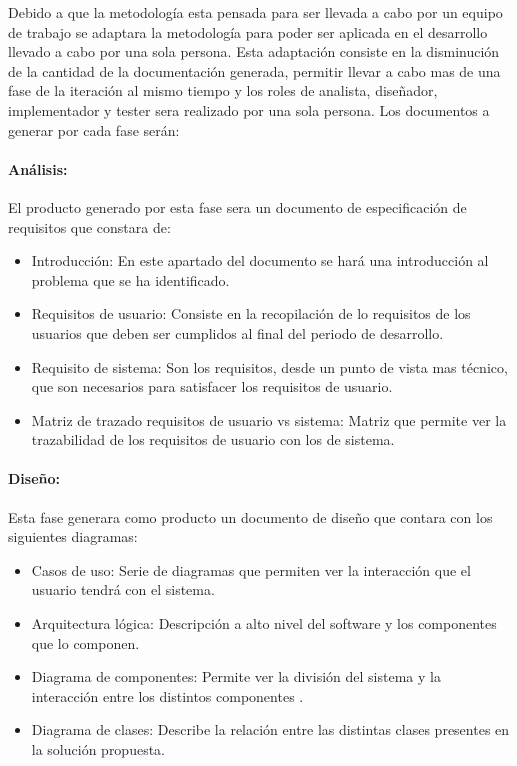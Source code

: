 \documentclass[11pt,letterpaper]{article}
\begin{document}
Debido a que la metodología esta pensada para ser llevada a cabo por un equipo de trabajo se adaptara la metodología para poder ser aplicada en el desarrollo llevado a cabo por una sola persona. Esta adaptación consiste en la disminución de la cantidad de la documentación generada, permitir llevar a cabo mas de una fase de la iteración al mismo tiempo y los roles de analista, diseñador, implementador y tester sera realizado por una sola persona. Los documentos a generar por cada fase serán:

\paragraph{Análisis:} El producto generado por esta fase sera un documento de especificación de requisitos que constara de:
\begin{itemize}
	\item Introducción: En este apartado del documento se hará una introducción al problema que se ha identificado.
	\item Requisitos de usuario: Consiste en la recopilación de lo requisitos de los usuarios que deben ser cumplidos al final del periodo de desarrollo.
	\item Requisito de sistema: Son los requisitos, desde un punto de vista mas técnico, que son necesarios para satisfacer los requisitos de usuario.
	\item Matriz de trazado requisitos de usuario vs sistema:  Matriz que permite ver la trazabilidad de los requisitos de usuario con los de sistema.
\end{itemize}
\paragraph{Diseño:} Esta fase generara como producto un documento de diseño que contara con los siguientes diagramas:
\begin{itemize}
	\item Casos de uso: Serie de diagramas que permiten ver la interacción que el usuario tendrá con el sistema.
	\item Arquitectura lógica: Descripción a alto nivel del software y los componentes que lo componen.
	\item Diagrama de componentes: Permite ver la división del sistema y la interacción entre los distintos componentes \cite{Bell2004}.
	\item Diagrama de clases: Describe la relación entre las distintas clases presentes en la solución propuesta.
\end{itemize}
\end{document}
